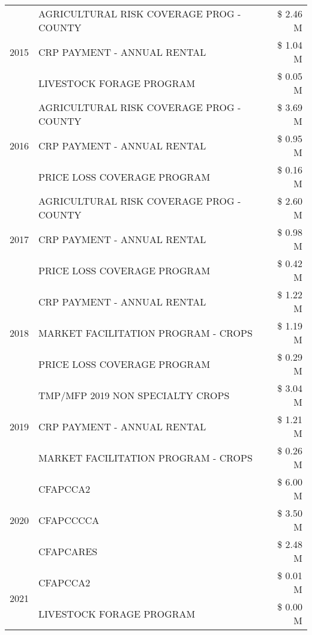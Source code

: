 \begin{tabular}{llr}
\multirow[t]{3}{*}{2015} & AGRICULTURAL RISK COVERAGE PROG - COUNTY & \$ 2.46 M \\
 & CRP PAYMENT - ANNUAL RENTAL & \$ 1.04 M \\
 & LIVESTOCK FORAGE PROGRAM & \$ 0.05 M \\
\cline{1-3}
\multirow[t]{3}{*}{2016} & AGRICULTURAL RISK COVERAGE PROG - COUNTY & \$ 3.69 M \\
 & CRP PAYMENT - ANNUAL RENTAL & \$ 0.95 M \\
 & PRICE LOSS COVERAGE PROGRAM & \$ 0.16 M \\
\cline{1-3}
\multirow[t]{3}{*}{2017} & AGRICULTURAL RISK COVERAGE PROG - COUNTY & \$ 2.60 M \\
 & CRP PAYMENT - ANNUAL RENTAL & \$ 0.98 M \\
 & PRICE LOSS COVERAGE PROGRAM & \$ 0.42 M \\
\cline{1-3}
\multirow[t]{3}{*}{2018} & CRP PAYMENT - ANNUAL RENTAL & \$ 1.22 M \\
 & MARKET FACILITATION PROGRAM - CROPS & \$ 1.19 M \\
 & PRICE LOSS COVERAGE PROGRAM & \$ 0.29 M \\
\cline{1-3}
\multirow[t]{3}{*}{2019} & TMP/MFP 2019 NON SPECIALTY CROPS & \$ 3.04 M \\
 & CRP PAYMENT - ANNUAL RENTAL & \$ 1.21 M \\
 & MARKET FACILITATION PROGRAM - CROPS & \$ 0.26 M \\
\cline{1-3}
\multirow[t]{3}{*}{2020} & CFAPCCA2 & \$ 6.00 M \\
 & CFAPCCCCA & \$ 3.50 M \\
 & CFAPCARES & \$ 2.48 M \\
\cline{1-3}
\multirow[t]{2}{*}{2021} & CFAPCCA2 & \$ 0.01 M \\
 & LIVESTOCK FORAGE PROGRAM & \$ 0.00 M \\
\cline{1-3}
\bottomrule
\end{tabular}
